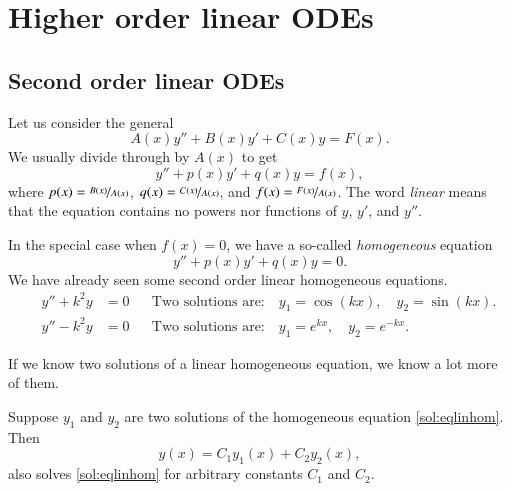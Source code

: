 \chapter{Higher order linear ODEs} \label{ho:chapter}


\section{Second order linear ODEs}
\label{solinear:section}


Let us consider the general
\emph{}
\begin{equation*}
A(x) y'' + B(x)y' + C(x)y = F(x) .
\end{equation*}
We usually divide through by $A(x)$ to get
\begin{equation} \label{sol:eqlin}
y'' + p(x)y' + q(x)y = f(x) ,
\end{equation}
where $p(x) = \nicefrac{B(x)}{A(x)}$, $q(x) = \nicefrac{C(x)}{A(x)}$, and
$f(x) = \nicefrac{F(x)}{A(x)}$.
The word \emph{linear} means that the equation contains no powers nor
functions of $y$, $y'$, and $y''$.

In the special case when $f(x) = 0$, we have a so-called
\emph{homogeneous}
equation
\begin{equation} \label{sol:eqlinhom}
y'' + p(x)y' + q(x)y = 0 .
\end{equation}
We have already seen some second order linear homogeneous equations.
\begin{align*}
\qquad y'' + k^2 y & = 0 &
& \text{Two solutions are:} \quad y_1 = \cos (kx), \quad y_2 = \sin(kx) . \qquad \\
\qquad y'' - k^2 y & = 0 &
& \text{Two solutions are:} \quad y_1 = e^{kx}, \quad y_2 = e^{-kx} . \qquad
\end{align*}

If we know two solutions of a linear homogeneous equation, we know a lot
more of them.

\begin{theorem}[Superposition]
Suppose $y_1$ and $y_2$ are two solutions of the
homogeneous equation \eqref{sol:eqlinhom}.  Then 
\begin{equation*}
y(x) = C_1 y_1(x) + C_2 y_2(x) ,
\end{equation*}
also solves \eqref{sol:eqlinhom} for arbitrary constants $C_1$ and $C_2$.
\end{theorem}

